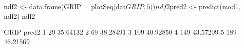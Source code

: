 \begin{Schunk}
\begin{Sinput}
 ndf2 <- data.frame(GRIP = plotSeq(dat$GRIP, 5))
 ndf2$pred2 <- predict(mod1, ndf2)
 ndf2
\end{Sinput}
\begin{Soutput}
  GRIP    pred2
1   29 35.64132
2   69 38.28491
3  109 40.92850
4  149 43.57209
5  189 46.21569
\end{Soutput}
\end{Schunk}

